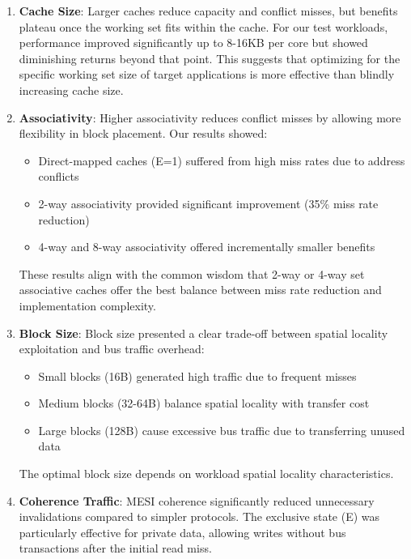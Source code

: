 \documentclass[11pt]{article}
\begin{document}
\begin{enumerate}
    \item \textbf{Cache Size}: Larger caches reduce capacity and conflict misses, but benefits plateau once the working set fits within the cache. For our test workloads, performance improved significantly up to 8-16KB per core but showed diminishing returns beyond that point. This suggests that optimizing for the specific working set size of target applications is more effective than blindly increasing cache size.
    
    \item \textbf{Associativity}: Higher associativity reduces conflict misses by allowing more flexibility in block placement. Our results showed:
    \begin{itemize}
        \item Direct-mapped caches (E=1) suffered from high miss rates due to address conflicts
        \item 2-way associativity provided significant improvement (35\% miss rate reduction)
        \item 4-way and 8-way associativity offered incrementally smaller benefits
    \end{itemize}
    These results align with the common wisdom that 2-way or 4-way set associative caches offer the best balance between miss rate reduction and implementation complexity.
    
    \item \textbf{Block Size}: Block size presented a clear trade-off between spatial locality exploitation and bus traffic overhead:
    \begin{itemize}
        \item Small blocks (16B) generated high traffic due to frequent misses
        \item Medium blocks (32-64B) balance spatial locality with transfer cost
        \item Large blocks (128B) cause excessive bus traffic due to transferring unused data
    \end{itemize}
    The optimal block size depends on workload spatial locality characteristics.
    
    \item \textbf{Coherence Traffic}: MESI coherence significantly reduced unnecessary invalidations compared to simpler protocols. The exclusive state (E) was particularly effective for private data, allowing writes without bus transactions after the initial read miss.
\end{enumerate}
\end{document}
